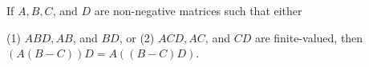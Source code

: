 If $A, B, C$, and $D$ are non-negative matrices such that either

(1) $ABD, AB$, and $BD$, or
(2) $ACD, AC$, and $CD$
are finite-valued, then $(A(B-C))D = A((B-C)D)$.
